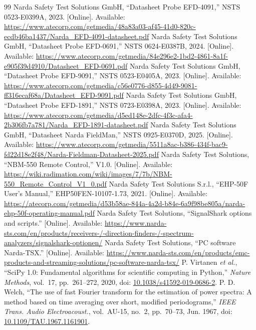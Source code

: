 \documentclass[10pt,letterpaper]{article}
\numberwithin{equation}{section}
\begin{document}
\clearpage
{}
{}
\renewcommand{\refname}{References}
\begin{thebibliography}{99}\small
{} Narda Safety Test Solutions GmbH, ``Datasheet Probe EFD-4091,'' NSTS 0523-E0399A, 2023. [Online]. Available: \url{https://www.atecorp.com/getmedia/48a83a03-af45-41d0-820c-ecdb46ba1437/Narda_EFD-4091-datasheet.pdf}
 Narda Safety Test Solutions GmbH, ``Datasheet Probe EFD-0691,'' NSTS 0624-E0387B, 2024. [Online]. Available: \url{https://www.atecorp.com/getmedia/84e296e2-1bd2-4861-8a1f-e905f39d4910/Datasheet_EFD-0691.pdf}
 Narda Safety Test Solutions GmbH, ``Datasheet Probe EFD-9091,'' NSTS 0523-E0405A, 2023. [Online]. Available: \url{https://www.atecorp.com/getmedia/c56e0776-d855-4d49-9081-ff316ecaf68a/Datasheet_EFD-9091.pdf}
 Narda Safety Test Solutions GmbH, ``Datasheet Probe EFD-1891,'' NSTS 0723-E0398A, 2023. [Online]. Available: \url{https://www.atecorp.com/getmedia/d5ed148e-2dfc-4f3c-afa4-2b306fb7a781/Narda_EFD-1891-datasheet.pdf}
 Narda Safety Test Solutions GmbH, ``Datasheet Narda FieldMan,'' NSTS 0925-E0370D, 2025. [Online]. Available: \url{https://www.atecorp.com/getmedia/5511a8ac-b386-434f-bac9-fd22d18e2f48/Narda-Fieldman-Datasheet-2025.pdf}
 Narda Safety Test Solutions, ``NBM-550 Remote Control,'' V1.0. [Online]. Available: \url{https://wiki.radimation.com/wiki/images/7/7b/NBM-550_Remote_Control_V1_0.pdf}
 Narda Safety Test Solutions S.r.l., ``EHP-50F User's Manual,'' EHP50FEN-10107-1.73, 2021. [Online]. Available: \url{https://atecorp.com/getmedia/d53b58ae-844a-4a2d-b84e-6a9f98be805a/narda-ehp-50f-operating-manual.pdf}
 Narda Safety Test Solutions, ``SignalShark options and scripts.'' [Online]. Available: \url{https://www.narda-sts.com/en/products/receivers-/-direction-finders-/-spectrum-analyzers/signalshark-optionen/}
 Narda Safety Test Solutions, ``PC software Narda-TSX.'' [Online]. Available: \url{https://www.narda-sts.com/en/products/emc-products-and-streaming-solutions/pc-software-narda-tsx/}
 P. Virtanen \emph{et al.}, ``SciPy 1.0: Fundamental algorithms for scientific computing in Python,'' \emph{Nature Methods}, vol.~17, pp.~261--272, 2020, doi: \href{https://doi.org/10.1038/s41592-019-0686-2}{10.1038/s41592-019-0686-2}.
 P. D. Welch, ``The use of fast Fourier transform for the estimation of power spectra: A method based on time averaging over short, modified periodograms,'' \emph{IEEE Trans. Audio Electroacoust.}, vol.~AU-15, no.~2, pp.~70--73, Jun. 1967, doi: \href{https://doi.org/10.1109/TAU.1967.1161901}{10.1109/TAU.1967.1161901}.

\end{thebibliography}
\end{document}
